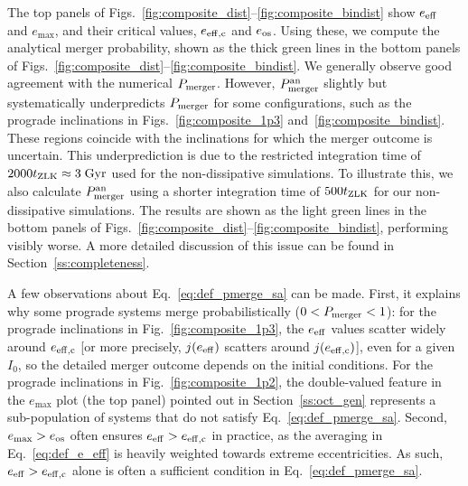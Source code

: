 \documentclass[
        fleqn,
        usenatbib,
    ]{mnras}
\begin{document}
The top panels of Figs.~\ref{fig:composite_dist}--\ref{fig:composite_bindist}
show $e_{\rm eff}$ and $e_{\max}$, and their critical values, $e_{\rm eff, c}$
and $e_{\rm os}$. Using these, we compute the analytical merger probability,
shown as the thick green lines in the bottom panels of
Figs.~\ref{fig:composite_dist}--\ref{fig:composite_bindist}. We generally
observe good agreement with the numerical $P_{\rm merger}$. However, $P_{\rm
merger}^{\rm an}$ slightly but systematically underpredicts $P_{\rm merger}$ for
some configurations, such as the prograde inclinations in
Figs.~\ref{fig:composite_1p3} and~\ref{fig:composite_bindist}. These regions
coincide with the inclinations for which the merger outcome is uncertain. This
underprediction is due to the restricted integration time of $2000 t_{\rm ZLK}
\approx 3\;\mathrm{Gyr}$ used for the non-dissipative simulations. To illustrate
this, we also calculate $P_{\rm merger}^{\rm an}$ using a shorter integration
time of $500 t_{\rm ZLK}$ for our non-dissipative simulations. The results are
shown as the light green lines in the bottom panels of
Figs.~\ref{fig:composite_dist}--\ref{fig:composite_bindist}, performing visibly
worse. A more detailed discussion of this issue can be found in
Section~\ref{ss:completeness}.

A few observations about Eq.~\eqref{eq:def_pmerge_sa} can be made. First, it
explains why some prograde systems merge probabilistically ($0 < P_{\rm merger}
< 1$): for the prograde inclinations in Fig.~\ref{fig:composite_1p3},
the $e_{\rm eff}$ values scatter widely around $e_{\rm eff,c}$ [or more
precisely, $j(e_{\rm eff})$ scatters around $j(e_{\rm eff,c})$], even for a
given $I_0$, so the detailed merger outcome depends on the initial conditions.
For the prograde inclinations in Fig.~\ref{fig:composite_1p2}, the double-valued
feature in the $e_{\max}$ plot (the top panel) pointed out in
Section~\ref{ss:oct_gen} represents a sub-population of systems that do not
satisfy Eq.~\eqref{eq:def_pmerge_sa}. Second, $e_{\max} > e_{\rm os}$ often
ensures $e_{\rm eff} > e_{\rm eff, c}$ in practice, as the averaging in
Eq.~\eqref{eq:def_e_eff} is heavily weighted towards extreme eccentricities. As
such, $e_{\rm eff} > e_{\rm eff, c}$ alone is often a sufficient condition in
Eq.~\eqref{eq:def_pmerge_sa}.
\end{document}

